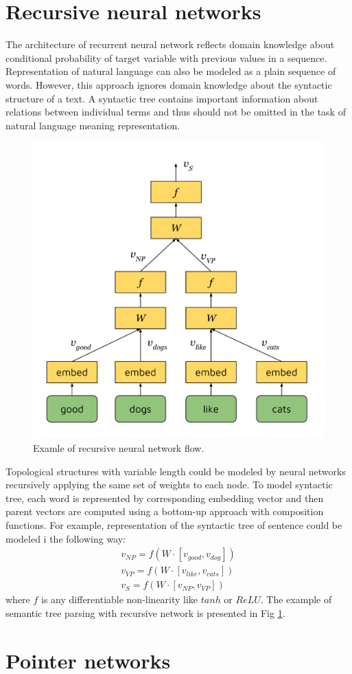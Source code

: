 \section{Recursive neural networks}
The architecture of recurrent neural network reflects domain knowledge about conditional probability of target variable with previous values in a sequence. Representation of natural language can also be modeled as a plain sequence of words. However, this approach ignores domain knowledge about the syntactic structure of a text. A syntactic tree contains important information about relations between individual terms and thus should not be omitted in the task of natural language meaning representation.
\begin{figure}
\centering
\includegraphics{Figures/rvnn}
\decoRule
\caption[RvNN flow]{Examle of recursive neural network flow.}
\label{fig:rvnn}
\end{figure}
Topological structures with variable length could be modeled by neural networks recursively applying the same set of weights to each node. To model syntactic tree, each word is represented by corresponding embedding vector and then parent vectors are computed using a bottom-up approach with composition functions. For example, representation of the syntactic tree of sentence  could be modeled i the following way:
\begin{equation}
\begin{split}
v_{NP} = f(W\cdot[v_{good}, v_{dog}])\\
v_{VP} = f(W\cdot[v_{like}, v_{cats}])\\
v_S = f(W\cdot[v_{NP}, v_{VP}])
\label{rvnn:example}
\end{split}
\end{equation}
where $f$ is any differentiable non-linearity like $tanh$ or $ReLU$. The example of semantic tree parsing with recursive network is presented in Fig \ref{fig:rvnn}. 

\section{Pointer networks}
